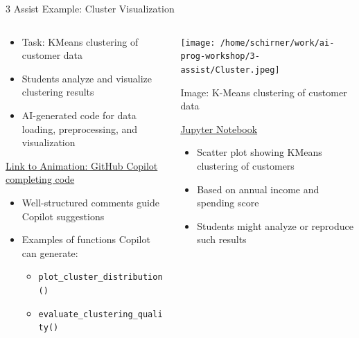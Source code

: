 \documentclass[xcolor=dvipsnames, aspectratio=169]{beamer}
\begin{document}
\begin{frame}{3 Assist Example: Cluster Visualization}
  \begin{columns}
    \begin{column}{0.6\textwidth}
      \begin{itemize}
        \item Task: KMeans clustering of customer data
        \item Students analyze and visualize clustering results
        \item AI-generated code for data loading, preprocessing, and visualization
      \end{itemize}
      \vspace{0.5em}
      \href{https://github.com/neu-ece-esl/ai-prog-workshop/tree/main/3-assist}{Link to Animation: GitHub Copilot completing code}
      \vspace{0.5em}
      \begin{itemize}
        \item Well-structured comments guide Copilot suggestions
        \item Examples of functions Copilot can generate:
        \begin{itemize}
          \item \texttt{plot\_cluster\_distribution()}
          \item \texttt{evaluate\_clustering\_quality()}
        \end{itemize}
      \end{itemize}
    \end{column}
    
    \begin{column}{0.4\textwidth}
      \texttt{[image: /home/schirner/work/ai-prog-workshop/3-assist/Cluster.jpeg]}
      \tiny\centerline{Image: K-Means clustering of customer data}
      \tiny\centerline{\href{https://github.com/neu-ece-esl/ai-prog-workshop/blob/main/3-assist/KMeans_Clustering.ipynb}{Jupyter Notebook}}

      \begin{itemize}
        \item Scatter plot showing KMeans clustering of customers
        \item Based on annual income and spending score
        \item Students might analyze or reproduce such results
      \end{itemize}
    \end{column}
  \end{columns}
\end{frame}
\end{document}
